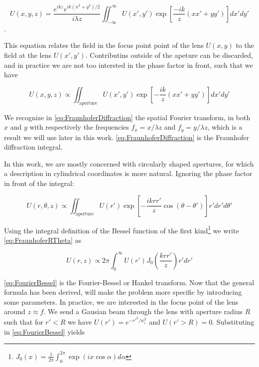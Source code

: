 \begin{mdframed}
    \begin{equation}\label{eq:FraunhoferDiffraction}
        U(x, y, z)=\frac{e^{i k z} e^{i k\left(x^{2}+y^{2}\right)/2}}{i \lambda z} \iint_{-\infty}^{\infty} U(x', y') \exp \left[\frac{-ik}{z}(x x'+y y')\right] dx' dy'
    \end{equation}. 
    
    This equation relates the field in the focus point point of the lens $U(x,y)$ to the field at the lens $U(x',y')$. Contributins outside of the apeture can be discarded, and in practice we are not too intersted in the phase factor in front, such that we have
    
    \begin{equation}\label{eq:FraunhoferSimplified}
        U(x,y,z) \propto 
        \iint_{\text{aperture}} U(x',y') \exp{\left[- \frac{ik}{z}(xx'+yy')\right]}dx'dy'
    \end{equation}
    
    We recognize in \cref{eq:FraunhoferDiffraction} the spatial Fourier transform, in both $x$ and $y$ with respectively the frequencies $f_x = x/\lambda z$ and $f_y = y/\lambda z$, which is a result we will use later in this work. \cref{eq:FraunhoferDiffraction} is the Fraunhofer diffraction integral.
\end{mdframed}

 In this work, we are mostly concerned with circularly shaped apertures, for which a description in cylindrical coordinates is more natural. Ignoring the phase factor in front of the integral:

\begin{equation}\label{eq:FraunhoferRTheta}
    U(r,\theta, z) \propto \iint_{\text{aperture}} U(r') \exp{\left[
    -\frac{i k r r'}{z} \cos{(\theta-\theta')} 
    \right]}r'dr'd\theta'
\end{equation}

Using the integral definition of the Bessel function of the first kind\footnote{$J_0(x) = \frac{1}{2\pi} \int_0^{2\pi} \exp{(i x \cos{\alpha})} d\alpha$} we write \cref{eq:FraunhoferRTheta} as 

\begin{equation}\label{eq:FourierBessel}
    U(r,z) \propto 2\pi \int_0^{\infty} U(r') J_0\left( \frac{k r r'}{z}\right) r'dr'
\end{equation}

\cref{eq:FourierBessel} is the Fourier-Bessel or Hankel transform. Now that the general formula has been derived, will make the problem more specific by introducing some parameters. In practice, we are interested in the focus point of the lens around $z \approx f$. We send a Gausian beam through the lens with aperture radius $R$ such that for $r' <R$ we have $U(r')=e^{-r'^2/w_i^2}$ and $U(r'>R)=0$. Substituting in \cref{eq:FourierBessel} yields

